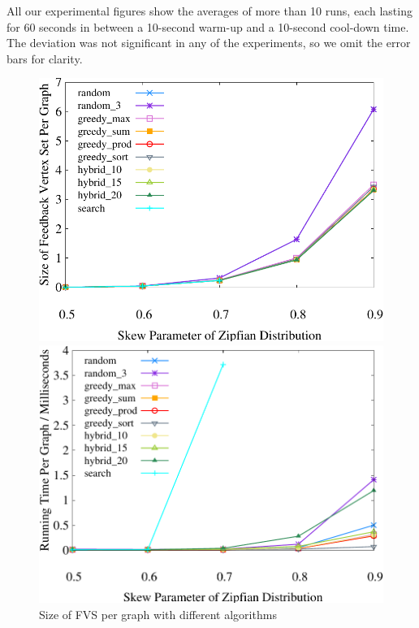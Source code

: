 All our experimental figures show the averages of more than 10 runs, each lasting for 60 seconds in between a 10-second warm-up and a 10-second cool-down time. The deviation was not significant in any of the experiments, so we omit the error bars for clarity.

\begin{figure}[t]
    \centering
    \begin{minipage}[b]{0.32\linewidth}
        \centering
        \includegraphics[width=\textwidth]{./exp_fig/fvs/fvs}
        \vspace{-2em}
        \caption{Size of FVS per graph with different algorithms}
        \label{fig:fvs:fvs}
    \end{minipage}
    \begin{minipage}[b]{0.32\linewidth}
        \centering
        \includegraphics[width=\textwidth]{./exp_fig/fvs/latency}

\end{minipage}
\end{figure}
